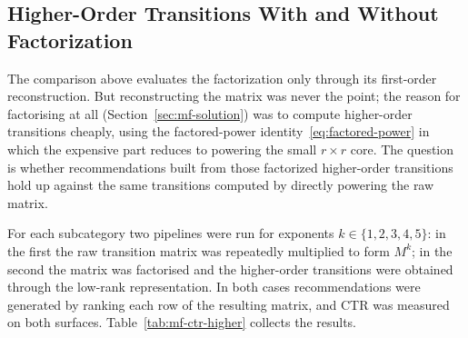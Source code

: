 \subsection{Higher-Order Transitions With and Without Factorization}
\label{sec:mf-ctr-higher}

The comparison above evaluates the factorization only through its first-order
reconstruction. But reconstructing the matrix was never the point; the reason for
factorising at all (Section~\ref{sec:mf-solution}) was to compute higher-order
transitions cheaply, using the factored-power identity~\eqref{eq:factored-power}
in which the expensive part reduces to powering the small $r\times r$ core. The
question is whether recommendations built from those factorized higher-order
transitions hold up against the same transitions computed by directly powering
the raw matrix.

For each subcategory two pipelines were run for exponents $k\in\{1,2,3,4,5\}$: in
the first the raw transition matrix was repeatedly multiplied to form $M^{k}$; in
the second the matrix was factorised and the higher-order transitions were
obtained through the low-rank representation. In both cases recommendations were
generated by ranking each row of the resulting matrix, and CTR was measured on
both surfaces. Table~\ref{tab:mf-ctr-higher} collects the results.

